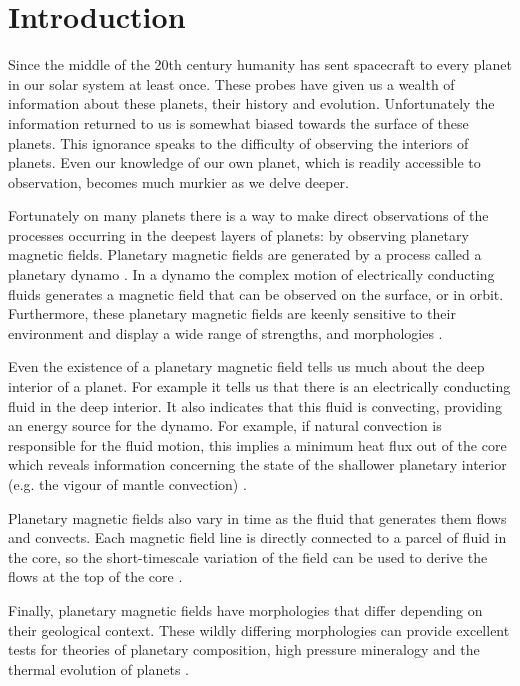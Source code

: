 
\chapter{Introduction}
\label{chap:introduction}
Since the middle of the 20th century humanity has sent spacecraft to every planet in our solar system at least once. These probes have given us a wealth of information about these planets, their history and evolution. Unfortunately the information returned to us is somewhat biased towards the surface of these planets. This ignorance speaks to the difficulty of observing the interiors of planets. Even our knowledge of our own planet, which is readily accessible to observation, becomes much murkier as we delve deeper. 

Fortunately on many planets there is a way to make direct observations of the processes occurring in the deepest layers of planets: by observing planetary magnetic fields. Planetary magnetic fields are generated by a process called a planetary dynamo \citep{larmor1919, jones2011}. In a dynamo the complex motion of electrically conducting fluids generates a magnetic field that can be observed on the surface, or in orbit. Furthermore, these planetary magnetic fields are keenly sensitive to their environment and display a wide range of strengths, and morphologies \citep{connerney2007, christensen2009review}.

Even the existence of a planetary magnetic field tells us much about the deep interior of a planet. For example it tells us that there is an electrically conducting fluid in the deep interior. It also indicates that this fluid is convecting, providing an energy source for the dynamo. For example, if natural convection is responsible for the fluid motion, this implies a minimum heat flux out of the core which reveals information concerning the state of the shallower planetary interior (e.g. the vigour of mantle convection) \citep{breuer2010}.

Planetary magnetic fields also vary in time as the fluid that generates them flows and convects. Each magnetic field line is directly connected to a parcel of fluid in the core, so the short-timescale variation of the field can be used to derive the flows at the top of the core \citep{bloxham1991,finlay2003}.

Finally, planetary magnetic fields have morphologies that differ depending on their geological context. These wildly differing morphologies can provide excellent tests for theories of planetary composition, high pressure mineralogy and the thermal evolution of planets \citep{stevenson2003}.

